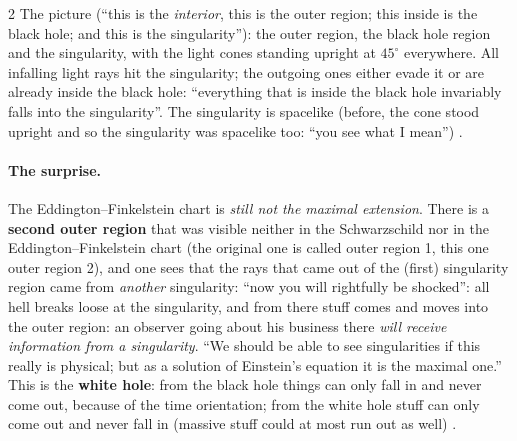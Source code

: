 \begin{paracol}{2}
The picture (``this is the \emph{interior}, this is the outer region; this inside is the black hole; and this is the singularity''): the outer region, the black hole region and the singularity, with the light cones standing upright at $45^\circ$ everywhere. All infalling light rays hit the singularity; the outgoing ones either evade it or are already inside the black hole: ``everything that is inside the black hole invariably falls into the singularity''. The singularity is spacelike (before, the cone stood upright and so the singularity was spacelike too: ``you see what I mean'') .

\paragraph{The surprise.} The Eddington--Finkelstein chart is \emph{still not the maximal extension}. There is a \textbf{second outer region} that was visible neither in the Schwarzschild nor in the Eddington--Finkelstein chart (the original one is called outer region 1, this one outer region 2), and one sees that the rays that came out of the (first) singularity region came from \emph{another} singularity: ``now you will rightfully be shocked'': all hell breaks loose at the singularity, and from there stuff comes and moves into the outer region: an observer going about his business there \emph{will receive information from a singularity}. ``We should be able to see singularities if this really is physical; but as a solution of Einstein's equation it is the maximal one.'' This is the \textbf{white hole}: from the black hole things can only fall in and never come out, because of the time orientation; from the white hole stuff can only come out and never fall in (massive stuff could at most run out as well) .


\end{paracol}
